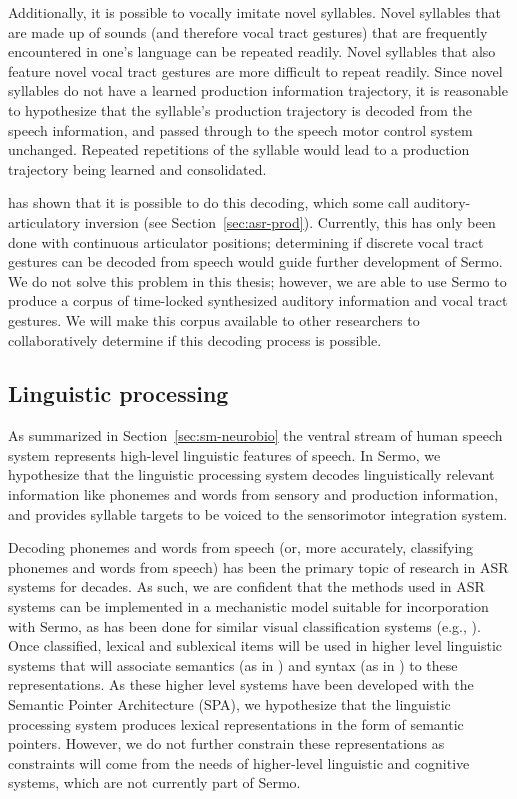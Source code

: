 Additionally,
it is possible to vocally imitate
novel syllables.
Novel syllables that are made up of sounds
(and therefore vocal tract gestures)
that are frequently encountered
in one's language can be
repeated readily.
Novel syllables that also feature
novel vocal tract gestures
are more difficult to repeat readily.
Since novel syllables do not have
a learned production information trajectory,
it is reasonable to hypothesize that
the syllable's production trajectory
is decoded from the speech information,
and passed through to the
speech motor control system unchanged.
Repeated repetitions of the syllable
would lead to a production trajectory
being learned and consolidated.

\cite{uria2011} has shown that it is possible to
do this decoding,
which some call auditory-articulatory inversion
(see Section~\ref{sec:asr-prod}).
Currently, this has only been done
with continuous articulator positions;
determining if discrete vocal tract gestures
can be decoded from speech
would guide further development of Sermo.
We do not solve this problem
in this thesis;
however, we are able to use Sermo
to produce a corpus of time-locked
synthesized auditory information
and vocal tract gestures.
We will make this corpus available
to other researchers
to collaboratively determine
if this decoding process is possible.

\subsection{Linguistic processing}

As summarized in Section~\ref{sec:sm-neurobio}
the ventral stream of human speech system
represents high-level linguistic features of speech.
In Sermo, we hypothesize that
the linguistic processing system
decodes linguistically relevant information
like phonemes and words
from sensory and production information,
and provides syllable targets
to be voiced to the sensorimotor integration system.

Decoding phonemes and words from speech
(or, more accurately,
classifying phonemes and words from speech)
has been the primary topic of research
in ASR systems for decades.
As such, we are confident that
the methods used in ASR systems
can be implemented in a mechanistic model
suitable for incorporation with Sermo,
as has been done for similar
visual classification systems
(e.g., \cite{hunsberger2013}).
Once classified, lexical and sublexical items
will be used in higher level linguistic
systems that will associate
semantics (as in \cite{blouw2013,blouw2015})
and syntax (as in \cite{stewart2014,stewart2015})
to these representations.
As these higher level systems
have been developed with
the Semantic Pointer Architecture (SPA),
we hypothesize that the linguistic processing system
produces lexical representations
in the form of semantic pointers.
However, we do not further constrain these representations
as constraints will come from the needs of
higher-level linguistic and cognitive systems,
which are not currently part of Sermo.

